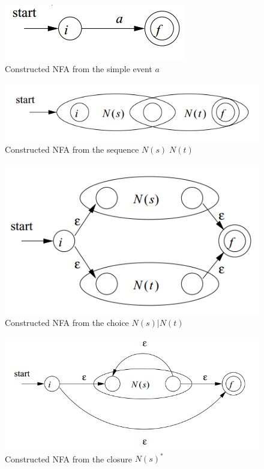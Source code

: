 		
		\begin{figure}[h]
			\centering
			\includegraphics[width=0.3\linewidth]{figures/chapter_4/subexpression_event}
			\caption{Constructed NFA from the simple event $a$ \redraw}
			\label{fig:cep:nfaevent}
		\end{figure}
		
		\begin{figure}[h]
			\centering
			\includegraphics[width=0.5\linewidth]{figures/chapter_4/subexpression_sequence}
			\caption{Constructed NFA from the sequence $N(s)\;N(t)$ \redraw}
			\label{fig:cep:nfasequence}
		\end{figure}
		
		\begin{figure}[h]
			\centering
			\includegraphics[width=0.5\linewidth]{figures/chapter_4/subexpression_choice}
			\caption{Constructed NFA from the choice $N(s)|N(t)$ \redraw}
			\label{fig:cep:nfachoice}
		\end{figure}
		
		\begin{figure}[h]
			\centering
			\includegraphics[width=0.5\linewidth]{figures/chapter_4/subexpression_asterisk}
			\caption{Constructed NFA from the closure $N(s)^*$ \redraw}
			\label{fig:cep:nfasterisk}
		\end{figure}
		
